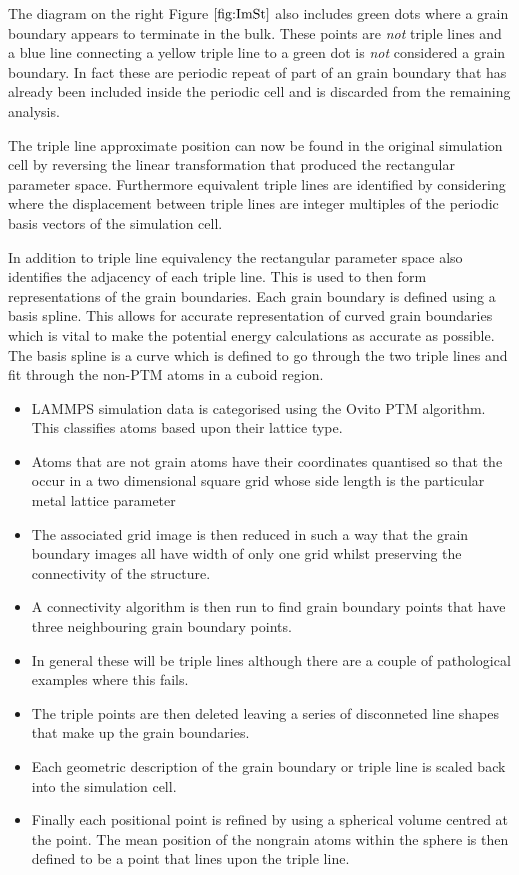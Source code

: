 \documentclass[12pt,a4paper]{book}
\begin{document}
The diagram on the right Figure $\ref{fig:ImSt}$ also includes green dots  where a grain boundary appears to terminate in the bulk. These points are \emph{not} triple lines and a blue line connecting a yellow triple line to a green dot is \emph{not} considered a grain boundary. In fact these are periodic repeat of part of an grain boundary that has already been included inside the periodic cell and is discarded from the remaining analysis.

The triple line approximate position can now be found in the original simulation cell by reversing the linear transformation that produced the rectangular parameter space. Furthermore equivalent triple lines are identified by considering where the displacement between triple lines are integer multiples of the periodic basis vectors of the simulation cell.

In addition to triple line equivalency the rectangular parameter space also identifies the adjacency of each triple line. This is used to then form representations of the grain boundaries. Each grain boundary is defined using a basis spline. This allows for accurate representation of curved grain boundaries which is vital to make the potential energy calculations as accurate as possible. The basis spline is a curve which is defined to go through the two triple lines and fit through the non-PTM atoms in a cuboid region.  

\begin{itemize}

	\item LAMMPS simulation data is categorised using the Ovito PTM algorithm. This classifies atoms based upon their lattice type.
	\item Atoms that are not grain  atoms have their coordinates quantised so that the occur in a two dimensional square grid whose side length is the particular metal lattice parameter
	\item The associated grid image is then reduced in such a way that the grain boundary images all have width of only one grid whilst preserving the connectivity of the structure.
	\item A connectivity algorithm is then run to find grain boundary points that have three neighbouring grain boundary points.
	\item In general these will be triple lines although there are a couple of pathological examples where this fails.
	\item The triple points are then deleted leaving a series of disconneted line shapes that make up the grain boundaries.
	\item Each geometric description of the grain boundary or triple line is scaled back into the simulation cell. 
	\item Finally each positional point is refined by using a spherical volume centred at the point. The mean position of the nongrain atoms within the sphere is then defined to be a point that lines upon the triple line. 

\end{itemize} 
\end{document}
